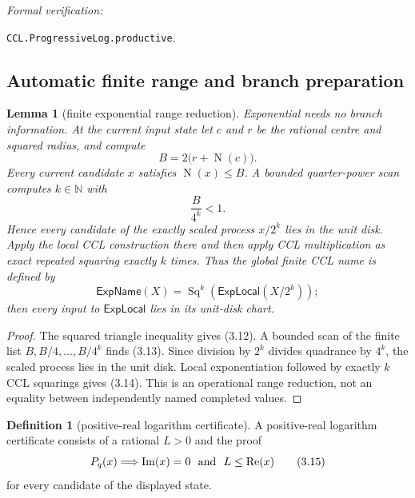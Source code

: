 \documentclass[10pt]{article}
\newtheorem{lemma}[theorem]{Lemma}
\theoremstyle{definition}
\newtheorem{definition}[theorem]{Definition}
\theoremstyle{remark}
\newcommand{\N}{\mathbb{N}}
\newcommand{\Norm}{\operatorname{N}}
\newcommand{\Ree}{\operatorname{Re}}
\newcommand{\Imm}{\operatorname{Im}}
\newcommand{\leanref}[1]{\par\smallskip\noindent
  \emph{Formal verification:}\par\nobreak
  {\raggedright\nolinkurl{#1}.\par}}
\begin{document}
\leanref{CCL.ProgressiveLog.productive}

\subsection{Automatic finite range and branch preparation}

\begin{lemma}[finite exponential range reduction]
Exponential needs no branch information.  At the current input state let
$c$ and $r$ be the rational centre and squared radius, and compute
\[
 B=2\bigl(r+\Norm(c)\bigr).
 \tag{3.12}
\]
Every current candidate $x$ satisfies $\Norm(x)\le B$.  A bounded
quarter-power scan computes $k\in\N$ with
\[
 \frac{B}{4^k}<1.
 \tag{3.13}
\]
Hence every candidate of the exactly scaled process $x/2^k$ lies in the unit
disk.  Apply the local CCL construction there and then apply CCL
multiplication as exact repeated squaring exactly $k$ times.  Thus the global
finite CCL name is defined by
\[
 \mathsf{ExpName}(X)=
 \operatorname{Sq}^{k}\!\left(\mathsf{ExpLocal}(X/2^k)\right);
\tag{3.14}
\]
then every input to $\mathsf{ExpLocal}$ lies in its unit-disk chart.
\end{lemma}

\begin{proof}
The squared triangle inequality gives (3.12).  A bounded scan of the finite
list $B,B/4,\ldots,B/4^k$ finds (3.13).  Since division by $2^k$ divides
quadrance by $4^k$, the scaled process lies in the unit disk.  Local
exponentiation followed by exactly $k$ CCL squarings gives (3.14).
This is an operational range reduction, not an equality between
independently named completed values.
\end{proof}

\begin{definition}[positive-real logarithm certificate]
A positive-real logarithm certificate consists of a rational $L>0$ and the
proof
\[
 P_q(x)\Longrightarrow \Imm(x)=0\ \hbox{ and }\ L\le\Ree(x)
\tag{3.15}
\]
for every candidate of the displayed state.
\end{definition}
\end{document}
